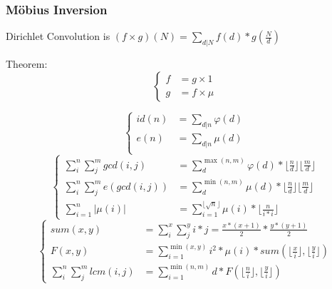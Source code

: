 \documentclass[10pt]{ctexart}
\begin{document}
{{\subsubsection{Möbius Inversion}
{
Dirichlet Convolution is $(f\times g)(N)=\sum_{d|N} f(d) * g(\frac{N}{d})$
\par
Theorem:
\begin{equation*}
    \left\{
        \begin{aligned} 
            f &= g \times 1 \\
            g &= f \times \mu
        \end{aligned} 
    \right. 
\end{equation*}
}

\begin{equation}
    \left\{
        \begin{aligned}
            id(n) &= \sum_{d|n} \varphi(d) \\
            e(n) &= \sum_{d|n} \mu(d) \\
        \end{aligned} 
    \right.
\end{equation}
\begin{equation}
    \left\{
        \begin{aligned}
            \sum_i^n\sum_j^mgcd(i, j)&=\sum_d^{\max(n, m)}\varphi(d) * \lfloor\frac{n}{d}\rfloor\lfloor\frac{m}{d}\rfloor \\
            \sum_i^n\sum_j^me(gcd(i, j))&=\sum_d^{\min(n, m)}\mu(d) * \lfloor\frac{n}{d}\rfloor\lfloor\frac{m}{d}\rfloor \\
            \sum_{i = 1}^n |\mu(i)|&=\sum_{i = 1}^{\lfloor \sqrt{n} \rfloor}\mu(i)*\lfloor \frac{n}{i * i} \rfloor
        \end{aligned} 
    \right.
\end{equation}
\begin{equation}
    \left\{
        \begin{aligned} 
            sum(x, y) &= \sum_i^x\sum_j^yi*j=\frac{x*(x + 1)}{2} * \frac{y * (y + 1)}{2}\\
            F(x, y) &= \sum_{i = 1}^{\min(x, y)} i^2 * \mu(i) * sum(\lfloor\frac{x}{i}\rfloor, \lfloor\frac{y}{i}\rfloor) \\
            \sum_i^n\sum_j^mlcm(i, j) &= \sum_{i = 1}^{\min(n, m)} d * F(\lfloor\frac{n}{i}\rfloor, \lfloor\frac{y}{i}\rfloor)
        \end{aligned} 
    \right. 
\end{equation}
}}
\end{document}
